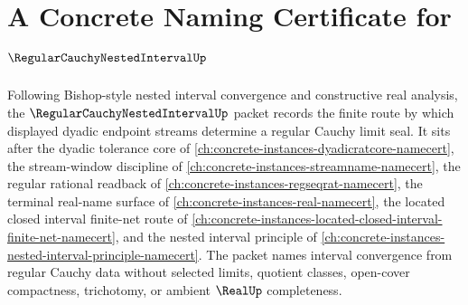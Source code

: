 \chapter{A Concrete Naming Certificate for $\RegularCauchyNestedIntervalUp$}
\label{ch:concrete-instances-regular-cauchy-nested-interval-namecert}

Following Bishop-style nested interval convergence and constructive real analysis, the $\RegularCauchyNestedIntervalUp$ packet records the finite route by which displayed dyadic endpoint streams determine a regular Cauchy limit seal. It sits after the dyadic tolerance core of \autoref{ch:concrete-instances-dyadicratcore-namecert}, the stream-window discipline of \autoref{ch:concrete-instances-streamname-namecert}, the regular rational readback of \autoref{ch:concrete-instances-regseqrat-namecert}, the terminal real-name surface of \autoref{ch:concrete-instances-real-namecert}, the located closed interval finite-net route of \autoref{ch:concrete-instances-located-closed-interval-finite-net-namecert}, and the nested interval principle of \autoref{ch:concrete-instances-nested-interval-principle-namecert}. The packet names interval convergence from regular Cauchy data without selected limits, quotient classes, open-cover compactness, trichotomy, or ambient $\RealUp$ completeness.

